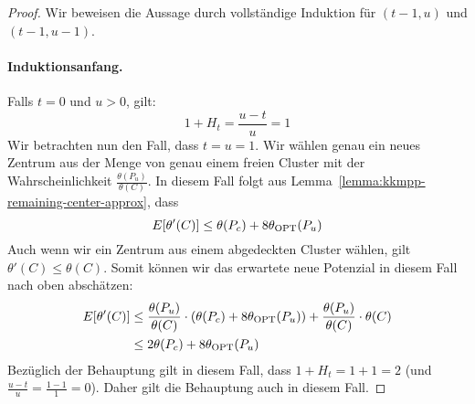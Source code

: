 \begin{proof}
	Wir beweisen die Aussage durch vollständige Induktion für $(t-1, u)$ und $(t-1, u-1)$.
	\paragraph{Induktionsanfang.} Falls $t=0$ und $u > 0$, gilt:
	\[ 1 + H_t = \frac{u-t}{u} = 1 \]
	Wir betrachten nun den Fall, dass $t = u = 1$. Wir wählen genau ein neues Zentrum aus der Menge von genau einem freien Cluster
	mit der Wahrscheinlichkeit $\frac{\theta(P_u)}{\theta(C)}$. In diesem Fall folgt aus
	Lemma~\ref{lemma:kkmpp-remaining-center-approx}, dass
	\[ E[\theta'(C)] \leq \theta(P_c) + 8 \theta_{\textrm{OPT}}(P_u) \]
	Auch wenn wir ein Zentrum aus einem abgedeckten Cluster wählen, gilt $\theta'(C) \leq \theta(C)$.
	Somit können wir das erwartete neue Potenzial in diesem Fall nach oben abschätzen:
	\begin{align*}
		E[\theta'(C)] &\leq \frac{\theta(P_u)}{\theta(C)} \cdot \left( \theta(P_c) + 8 \theta_{\textrm{OPT}}(P_u) \right)
							+ \frac{\theta(P_u)}{\theta(C)} \cdot \theta(C) \\
					  &\leq 2 \theta(P_c) + 8 \theta_{\textrm{OPT}}(P_u)
	\end{align*}
	Bezüglich der Behauptung gilt in diesem Fall, dass $1 + H_t = 1 + 1 = 2$ (und $\frac{u-t}{u} = \frac{1-1}{1} = 0$).
	Daher gilt die Behauptung auch in diesem Fall.

\end{proof}
